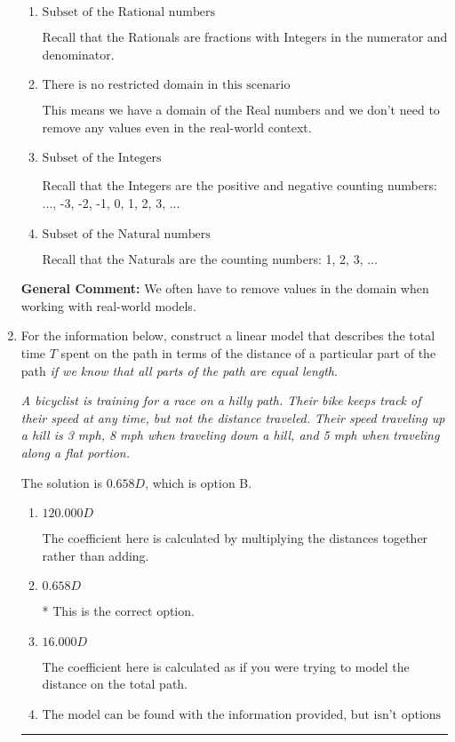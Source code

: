 \documentclass{extbook}[14pt]
\newcommand{\litem}[1]{\item #1

\rule{\textwidth}{0.4pt}}
\begin{document}
\begin{enumerate}
{\begin{enumerate}[label=\Alph*.]
This means we have a domain of the Real numbers but need to throw out values based on the context.
\item \( \text{Subset of the Rational numbers} \)

Recall that the Rationals are fractions with Integers in the numerator and denominator.
\item \( \text{There is no restricted domain in this scenario} \)

This means we have a domain of the Real numbers and we don't need to remove any values even in the real-world context.
\item \( \text{Subset of the Integers} \)

Recall that the Integers are the positive and negative counting numbers: ..., -3, -2, -1, 0, 1, 2, 3, ... 
\item \( \text{Subset of the Natural numbers} \)

Recall that the Naturals are the counting numbers: 1, 2, 3, ...
\end{enumerate}

\textbf{General Comment:} We often have to remove values in the domain when working with real-world models.
}
\litem{
For the information below, construct a linear model that describes the total time $T$ spent on the path in terms of the distance of a particular part of the path \textit{if we know that all parts of the path are equal length}.

\begin{center}
    \textit{ A bicyclist is training for a race on a hilly path. Their bike keeps track of their speed at any time, but not the distance traveled. Their speed traveling up a hill is 3 mph, 8 mph when traveling down a hill, and 5 mph when traveling along a flat portion. }
\end{center}
The solution is \( 0.658 D \), which is option B.\begin{enumerate}[label=\Alph*.]
\item \( 120.000 D \)

The coefficient here is calculated by multiplying the distances together rather than adding.
\item \( 0.658 D \)

* This is the correct option.
\item \( 16.000 D \)

The coefficient here is calculated as if you were trying to model the distance on the total path.
\item \( \text{The model can be found with the information provided, but isn't options 1-3.} \)


\end{enumerate}}
\end{enumerate}
\end{document}
